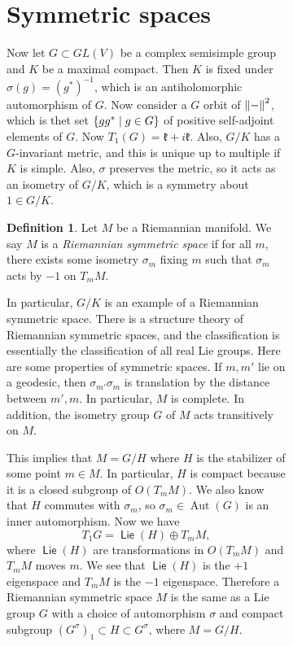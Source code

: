 \documentclass[leqno, openany]{memoir}
\theoremstyle{definition}
\newtheorem{defn}[thm]{Definition}
\theoremstyle{remark}
\theoremstyle{plain}
\theoremstyle{definition}
\theoremstyle{remark}
\newcommand{\mf}[1]{\mathfrak{#1}}
\DeclareMathOperator{\Aut}{Aut}
\DeclareMathOperator{\Lie}{\mathsf{Lie}}
\begin{document}
\begin{figure}[H]
\begin{figure}[H]
\section{Symmetric spaces}%

Now let $G \subset GL(V)$ be a complex semisimple group and $K$ be a maximal
compact. Then $K$ is fixed under $\sigma(g) = {(g^*)}^{-1}$, which is an
antiholomorphic automorphism of $G$. Now consider a $G$ orbit of $\norm{-}^2$,
which is thet set $\qty{gg^* \mid g \in G}$ of positive self-adjoint elements
of $G$. Now $T_1(G) = \mf{k} + i \mf{k}$. Also, $G/K$ has a $G$-invariant
metric, and this is unique up to multiple if $K$ is simple. Also, $\sigma$
preserves the metric, so it acts as an isometry of $G/K$, which is a symmetry
about $1 \in G/K$.

\begin{defn} Let $M$ be a Riemannian manifold. We say $M$ is a
\textit{Riemannian symmetric space} if for all $m$, there exists some isometry
$\sigma_m$ fixing $m$ such that $\sigma_m$ acts by $-1$ on $T_m M$.  \end{defn}

In particular, $G/K$ is an example of a Riemannian symmetric space. There is a
structure theory of Riemannian symmetric spaces, and the classification is
essentially the classification of all real Lie groups. Here are some properties
of symmetric spaces. If $m, m'$ lie on a geodesic, then $\sigma_{m'} \sigma_m$
is translation by the distance between $m', m$. In particular, $M$ is complete.
In addition, the isometry group $G$ of $M$ acts transitively on $M$.

This implies that $M = G/H$ where $H$ is the stabilizer of some point $m \in
M$. In particular, $H$ is compact because it is a closed subgroup of $O(T_m
M)$. We also know that $H$ commutes with $\sigma_m$, so $\sigma_m \in \Aut(G)$
is an inner automorphism. Now we have \[ T_1 G = \Lie(H) \oplus T_m M, \] where
$\Lie(H)$ are transformations in $O(T_m M)$ and $T_m M$ moves $m$. We see that
$\Lie(H)$ is the $+1$ eigenspace and $T_m M$ is the $-1$ eigenspace. Therefore
a Riemannian symmetric space $M$ is the same as a Lie group $G$ with a choice
of automorphism $\sigma$ and compact subgroup ${(G^{\sigma})}_1 \subset H
\subset G^{\sigma}$, where $M = G/H$.


\end{figure}
\end{figure}
\end{document}
